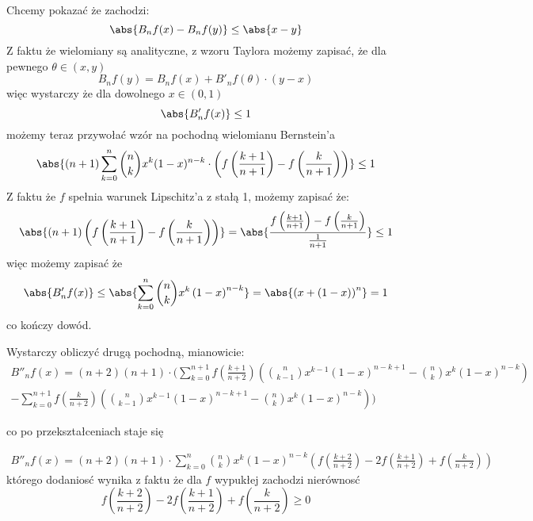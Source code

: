 \documentclass[11pt]{scrartcl}
\begin{document}
            \begin{walk}
                \item Chcemy pokazać że zachodzi:
                  \[
                    \abs{B_nf(x) - B_nf(y)} \leq \abs{x-y}  
                  \]
                  Z faktu że wielomiany są analityczne, z wzoru Taylora możemy zapisać, że dla pewnego $\theta \in (x,y)$
                  \[
                      B_nf(y) = B_nf(x)+ B'_nf(\theta) \cdot (y-x)
                  \]
                  więc wystarczy że dla dowolnego $x \in (0, 1)$
                  \[
                    \abs{ B'_nf(x) } \leq 1
                  \]
                  możemy teraz przywołać wzór na pochodną wielomianu Bernstein'a
                  \[
                    \abs{\left ( n+1 \right ) \sum_{k=0}^{n}  \binom{n}{k} x^k (1-x)^{n-k} \cdot \left ( f \left ( \frac{k+1}{n+1} \right )  - f \left ( \frac{k}{n+1} \right ) \right ) } \leq 1 
                  \]
                  Z faktu że $f$ spełnia warunek Lipschitz'a z stałą 1, możemy zapisać że:
                  \[
                     \abs{(n+1) \left ( f \left ( \frac{k+1}{n+1} \right )  - f \left ( \frac{k}{n+1} \right ) \right ) } = \abs{\frac{f \left ( \frac{k+1}{n+1} \right )  - f \left ( \frac{k}{n+1} \right )}{\frac{1}{n+1}}}\leq 1 
                  \]
                  więc możemy zapisać że
                  \[
                    \abs{B'_n f(x)} \leq \abs{\sum_{k=0}^{n} \binom{n}{k} x^k \left ( 1-x \right )^{n-k} } = \abs{\left ( x + (1-x) \right )^n} = 1   
                  \]
                  co kończy dowód.
                \item Wystarczy obliczyć drugą pochodną, mianowicie:
                  \begin{gather*}
                    B''_n f(x) = (n+2) (n+1) \cdot ( \sum_{k=0}^{n+1} f \left ( \frac{k+1}{n+2} \right ) \left ( \binom{n}{k-1} x^{k-1} (1-x)^{n-k+1} - \binom{n}{k} x^k (1-x)^{n-k} \right ) \\
                    - \sum_{k=0}^{n+1} f \left ( \frac{k}{n+2} \right ) \left ( \binom{n}{k-1} x^{k-1} (1-x)^{n-k+1} - \binom{n}{k} x^k (1-x)^{n-k} \right )  )
                  \end{gather*}

                  co po przekształceniach staje się


                  \begin{gather*}
                      B''_n f(x) = (n+2) (n+1) \cdot \sum_{k=0}^{n} \binom{n}{k} x^{k} (1-x)^{n-k} \left ( f \left ( \frac{k+2}{n+2} \right ) - 2 f \left ( \frac{k+1}{n+2} \right ) + f \left ( \frac{k}{n+2} \right ) \right )
                  \end{gather*}
                  którego dodaniosć wynika z faktu że dla $f$ wypukłej zachodzi nierównosć
                  \[
                      f \left ( \frac{k+2}{n+2} \right ) - 2 f \left ( \frac{k+1}{n+2} \right ) + f \left ( \frac{k}{n+2} \right ) \geq 0
                  \]
                  
            \end{walk}
            
\end{document}
